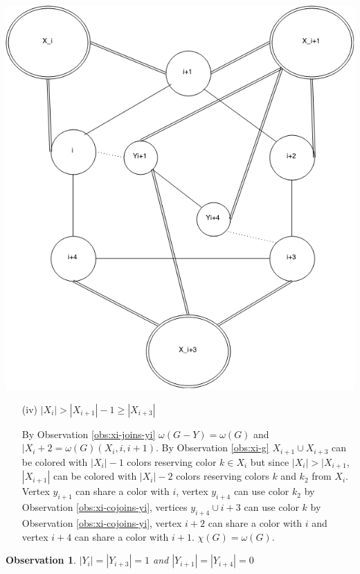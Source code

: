 \documentclass[12pt]{article}
\newtheorem{Observation}[Theorem]{Observation}
\begin{document}
\begin{minipage}{0.5\textwidth}\raggedleft
	\includegraphics[width=\linewidth]{Yi1-Yi4.png}
	\begin{itemize}
		\item[(iv)]
			$|X_{i}| > |X_{i+1}| - 1 \geq |X_{i+3}|$

			By Observation \ref{obs:xi-joins-yi} $\omega(G - Y) = \omega(G)$ and $|X_{i} +2 = \omega(G) (X_{i}, i, i+1)$. By Observation \ref{obs:xi-g} $X_{i+1} \cup X_{i+3}$ can be colored with $|X_i| - 1$ colors reserving color $k \in X_{i}$ but since $|X_{i}| > |X_{i+1}$, $|X_{i+1}|$ can be colored with $|X_i| -2 $ colors reserving colors $k$ and $k_2$ from $X_{i}$. Vertex $y_{i+1}$ can share a color with $i$, vertex $y_{i+4}$ can use color $k_2$ by Observation \ref{obs:xi-cojoins-yi}, vertices $y_{i+4} \cup i+3$ can use color $k$ by Observation \ref{obs:xi-cojoins-yi}, vertex $i+2$ can share a color with $i$ and vertex $i+4$ can share a color with $i+1$. $\chi(G) = \omega(G)$.
	\end{itemize}
\end{minipage}
\clearpage



\begin{Observation}\label{obs:yi-yi3} 
$|Y_{i}| = |Y_{i+3}| = 1$ and $|Y_{i+1}| = |Y_{i+4}| = 0$
\end{Observation}
\end{document}
